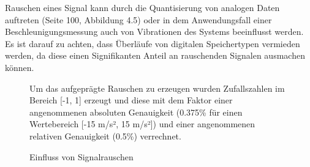 \FloatBarrier
{}
Rauschen eines Signal kann durch die Quantisierung von analogen Daten auftreten  (Seite 100, Abbildung 4.5) oder in dem Anwendungsfall einer Beschleunigungsmessung auch von Vibrationen des Systems beeinflusst werden.
Es ist darauf zu achten, dass Überläufe von digitalen Speichertypen vermieden werden, da diese einen Signifikanten Anteil an rauschenden Signalen ausmachen können. %

\begin{figure}[ht!]
\vspace{0.25cm}
\begin{center}
\caption{Einfluss von Signalrauschen}
\label{fig:SzeneNoise}
\end{center}

\vspace{0.25cm}
Um das aufgeprägte Rauschen zu erzeugen wurden Zufallszahlen im Bereich [-1, 1] erzeugt und diese mit dem Faktor einer angenommenen absoluten Genauigkeit (0.375\% für einen Wertebereich [-15 m/s², 15 m/s²]) und einer angenommenen relativen Genauigkeit (0.5\%) verrechnet.
\end{figure}

